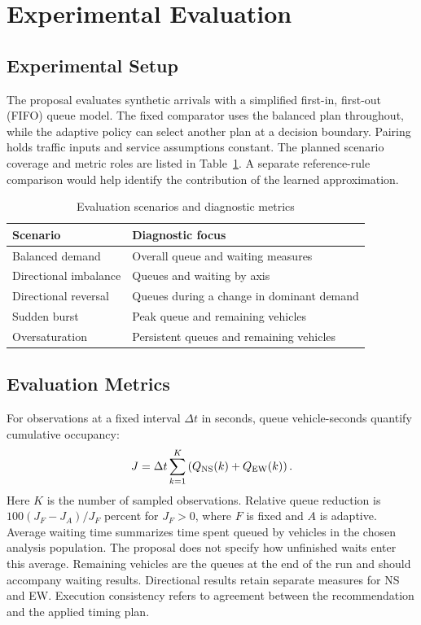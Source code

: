 \section{Experimental Evaluation}
\subsection{Experimental Setup}
The proposal evaluates synthetic arrivals with a simplified first-in, first-out (FIFO) queue model. The fixed comparator uses the balanced plan throughout, while the adaptive policy can select another plan at a decision boundary. Pairing holds traffic inputs and service assumptions constant. The planned scenario coverage and metric roles are listed in Table~\ref{tab:cases}. A separate reference-rule comparison would help identify the contribution of the learned approximation.

\begin{table}[t]
\caption{Evaluation scenarios and diagnostic metrics}
\label{tab:cases}\centering\footnotesize
\begin{tabular}{@{}p{}p{}@{}}
\toprule Scenario & Diagnostic focus\\ \midrule
Balanced demand & Overall queue and waiting measures\\
Directional imbalance & Queues and waiting by axis\\
Directional reversal & Queues during a change in dominant demand\\
Sudden burst & Peak queue and remaining vehicles\\
Oversaturation & Persistent queues and remaining vehicles\\
\bottomrule
\end{tabular}
\end{table}

\subsection{Evaluation Metrics}
For observations at a fixed interval $\Delta t$ in seconds, queue vehicle-seconds quantify cumulative occupancy:
\begin{equation}
J=\Delta t\sum_{k=1}^{K}\left(Q_{\rm NS}(k)+Q_{\rm EW}(k)\right).
\label{eq:queue}
\end{equation}
Here $K$ is the number of sampled observations. Relative queue reduction is $100(J_F-J_A)/J_F$ percent for $J_F>0$, where $F$ is fixed and $A$ is adaptive. Average waiting time summarizes time spent queued by vehicles in the chosen analysis population. The proposal does not specify how unfinished waits enter this average. Remaining vehicles are the queues at the end of the run and should accompany waiting results. Directional results retain separate measures for NS and EW. Execution consistency refers to agreement between the recommendation and the applied timing plan.

